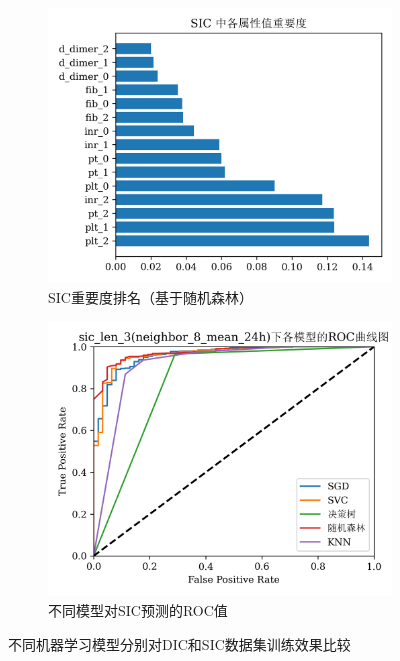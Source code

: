 \documentclass[12pt, a4paper, oneside]{ctexart}
\numberwithin{equation}{section}  %
\begin{document}
\begin{figure}[htbp]
    \bigskip
    \hspace{-2cm}
    \begin{subfigure}{0.6\textwidth}
        \includegraphics[scale=0.75]{sic_attributes_rank.png}
        \caption{SIC重要度排名（基于随机森林）}
    \end{subfigure}
    \begin{subfigure}{0.6\textwidth}
        \includegraphics[scale=0.75]{sic_len_3(neighbor_8_mean_24h)_roc_curves.png}
        \caption{不同模型对SIC预测的ROC值}
    \end{subfigure}
    \caption{不同机器学习模型分别对DIC和SIC数据集训练效果比较}
    \label{fig-ML-compare}
\end{figure}
\clearpage
\end{document}
